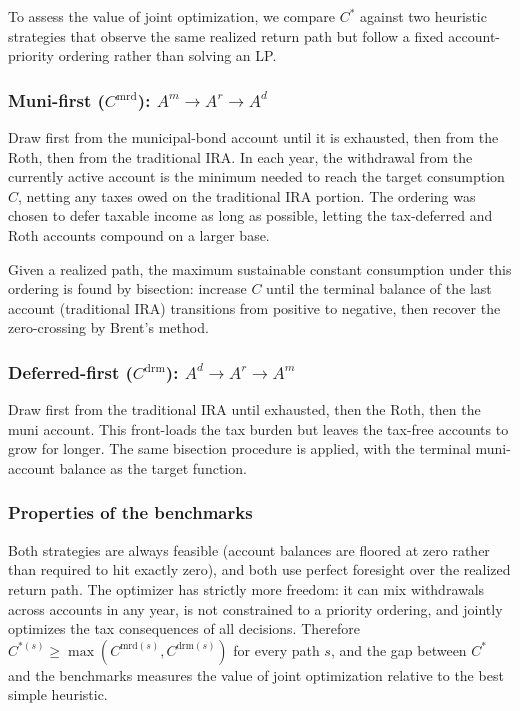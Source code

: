 \documentclass[12pt]{article}
\newcommand{\Copt}{C^{*}}
\newcommand{\Cmdr}{C^{\mathrm{mrd}}}
\newcommand{\Cdrm}{C^{\mathrm{drm}}}
\begin{document}
To assess the value of joint optimization, we compare $\Copt$ against two
heuristic strategies that observe the same realized return path but follow a
fixed account-priority ordering rather than solving an LP.

\subsubsection*{Muni-first (\texorpdfstring{$\Cmdr$}{C-mdr}):
  $A^m \to A^r \to A^d$}

Draw first from the municipal-bond account until it is exhausted, then from
the Roth, then from the traditional IRA. In each year, the withdrawal from
the currently active account is the minimum needed to reach the target
consumption $C$, netting any taxes owed on the traditional IRA portion. The
ordering was chosen to defer taxable income as long as possible, letting
the tax-deferred and Roth accounts compound on a larger base.

Given a realized path, the maximum sustainable constant consumption under
this ordering is found by bisection: increase $C$ until the terminal
balance of the last account (traditional IRA) transitions from positive
to negative, then recover the zero-crossing by Brent's method.

\subsubsection*{Deferred-first (\texorpdfstring{$\Cdrm$}{C-drm}):
  $A^d \to A^r \to A^m$}

Draw first from the traditional IRA until exhausted, then the Roth, then
the muni account. This front-loads the tax burden but leaves the tax-free
accounts to grow for longer. The same bisection procedure is applied, with
the terminal muni-account balance as the target function.

\subsubsection*{Properties of the benchmarks}

Both strategies are always feasible (account balances are floored at zero
rather than required to hit exactly zero), and both use perfect foresight
over the realized return path. The optimizer has strictly more freedom: it
can mix withdrawals across accounts in any year, is not constrained to a
priority ordering, and jointly optimizes the tax consequences of all
decisions. Therefore $C^{*(s)} \geq \max(C^{\mathrm{mrd}(s)}, C^{\mathrm{drm}(s)})$
for every path $s$, and the gap between $\Copt$ and the benchmarks measures
the value of joint optimization relative to the best simple heuristic.
\end{document}
